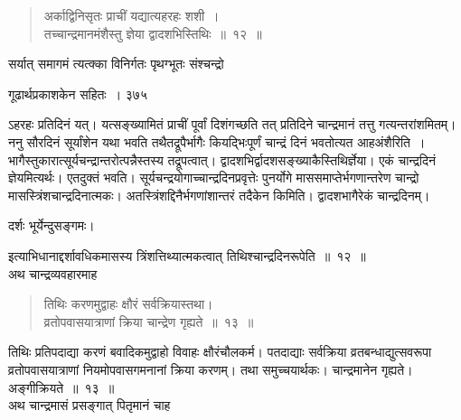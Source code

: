 \documentclass[11pt, openany]{book}
\begin{document}

\begin{quote}
{\ssi अर्काद्विनिसृतः प्राचीं यद्यात्यहरहः शशी~।\\
तच्चान्द्रमानमंशैस्तु ज्ञेया द्वादशभिस्तिथिः~॥~१२~॥}
\end{quote}
 सर्यात् समागमं त्यत्क्का विनिर्गतः पृथग्भूतः संश्चन्द्रो \textendash



\newpage


\hspace{3cm} गूढार्थप्रकाशकेन सहितः~। \hfill ३७५
\vspace{1cm}


\noindent ऽहरहः प्रतिदिनं यत्। यत्सङ्ख्यामितं प्राचीं पूर्वां दिशंगच्छति तत् प्रतिदिने चान्द्रमानं तत्तु गत्यन्तरांशमितम्। ननु सौरदिनं सूर्यांशेन यथा भवति तथैतद्रूपैर्भागैः कियद्भिःपूर्णं चान्द्रं दिनं भवतोत्यत आह\textendash अंशैरिति~। भागैस्तुकारात्सूर्यचन्द्रान्तरोत्पन्नैस्तस्य तद्रूपत्वात्। द्वादशभिर्द्वादशसङ्ख्याकैस्तिथिर्ज्ञेया। एकं चान्द्रदिनं ज्ञेयमित्यर्थः। एतदुक्तं भवति। सूर्यचन्द्रयोगाच्चान्द्रदिनप्रवृत्तेः पुनर्योगे माससमाप्तेर्भगणान्तरेण चान्द्रो मासस्त्रिंशचान्द्रदिनात्मकः। अतस्त्रिंशद्दिनैर्भगणांशान्तरं तदैकेन किमिति। द्वादशभागैरेकं चान्द्रदिनम्। 

\begin{center}
 दर्शः भूर्येन्दुसङ्गमः। 
\end{center}

इत्याभिधानाद्दर्शावधिकमासस्य त्रिंशत्तिथ्यात्मकत्वात् तिथिश्चान्द्रदिनरूपेति~॥~१२~॥ \\
अथ चान्द्रव्यवहारमाह\textendash


\begin{quote}
{\ssi तिथिः करणमुद्वाहः क्षौरं सर्वक्रियास्तथा।\\
व्रतोपवासयात्राणां क्रिया चान्द्रेण गृह्यते~॥~१३~॥}
\end{quote}
 तिथिः प्रतिपदाद्या करणं बवादिकमुद्वाहो विवाहः क्षौरंचौलकर्म। पतदाद्याः सर्वक्रिया व्रतबन्धाद्युत्सवरूपा व्रतोपवासयात्राणां नियमोपवासगमनानां क्रिया करणम्। तथा समुच्चयार्थकः। चान्द्रमानेन गृह्यते। अङ्गीक्रियते~॥~१३~॥\\
\noindent अथ चान्द्रमासं प्रसङ्गात् पितृमानं चाह\textendash

\end{document}
